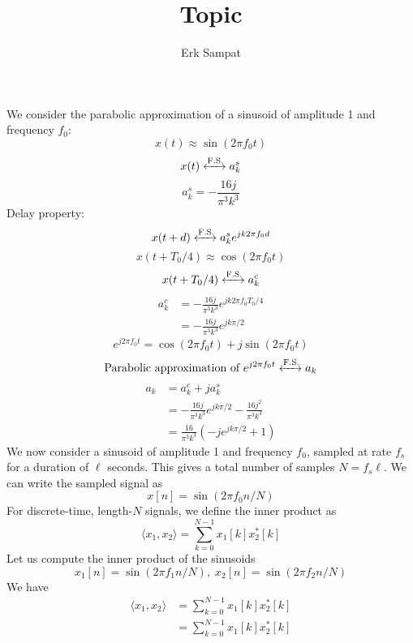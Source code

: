 

\title{Topic}
\author{Erk Sampat}

	We consider the parabolic approximation of a sinusoid of amplitude 1 and frequency $f_{0}$:
	$$x(t)\approx\sin(2\pi f_{0}t)$$
	$$x(t)\xleftrightarrow{\text{F.S.}}a^{s}_{k}$$
	$$a^{s}_{k}=-\frac{16j}{\pi^{3}k^{3}}$$
	Delay property:
	$$x(t+d)\xleftrightarrow{\text{F.S.}}a^{s}_{k}e^{jk2\pi f_{0}d}$$
	$$x(t+T_{0}/4)\approx\cos(2\pi f_{0}t)$$
	$$x(t+T_{0}/4)\xleftrightarrow{\text{F.S.}}a^{c}_{k}$$
	\begin{align*}
		a^{c}_{k} &= -\frac{16j}{\pi^{3}k^{3}}e^{jk2\pi f_{0}T_{0}/4} \\
		&= -\frac{16j}{\pi^{3}k^{3}}e^{jk\pi/2}
	\end{align*}
	$$e^{j2\pi f_{0}t}=\cos(2\pi f_{0}t)+j\sin(2\pi f_{0}t)$$
	$$\text{Parabolic approximation of }e^{j2\pi f_{0}t}\xleftrightarrow{\text{F.S.}}a_{k}$$
	\begin{align*}
		a_{k} &= a^{c}_{k}+ja^{s}_{k} \\
		&= -\frac{16j}{\pi^{3}k^{3}}e^{jk\pi/2}-\frac{16j^{2}}{\pi^{3}k^{3}} \\
		&= \frac{16}{\pi^{3}k^{3}}(-je^{jk\pi/2}+1)
	\end{align*}
	We now consider a sinusoid of amplitude 1 and frequency $f_{0}$, sampled at rate $f_{s}$ for a duration of $\ell$ seconds. This gives a total number of samples $N=f_{s}\ell$. We can write the sampled signal as
	$$x[n]=\sin(2\pi f_{0}n/N)$$
	For discrete-time, length-$N$ signals, we define the inner product as
	$$\langle x_{1},x_{2}\rangle=\sum_{k=0}^{N-1}x_{1}[k]x_{2}^{*}[k]$$
	Let us compute the inner product of the sinusoids
	$$x_{1}[n]=\sin(2\pi f_{1}n/N),\; x_{2}[n]=\sin(2\pi f_{2}n/N)$$
	We have
	\begin{align*}
		\langle x_{1},x_{2}\rangle &= \sum_{k=0}^{N-1}x_{1}[k]x_{2}^{*}[k] \\
		&= \sum_{k=0}^{N-1}x_{1}[k]x_{2}^{*}[k] \\
	\end{align*}
